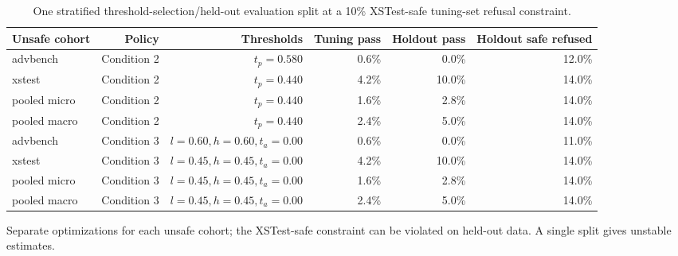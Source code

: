 \begin{table}[t]
\centering
\small
\caption{One stratified threshold-selection/held-out evaluation split at a 10\% XSTest-safe tuning-set refusal constraint.}
\label{tab:jev_holdout}
\begin{tabular}{lrrrrr}
\toprule
Unsafe cohort & Policy & Thresholds & Tuning pass & Holdout pass & Holdout safe refused \\
\midrule
advbench & Condition 2 & $t_p=0.580$ & 0.6\% & 0.0\% & 12.0\% \\
xstest & Condition 2 & $t_p=0.440$ & 4.2\% & 10.0\% & 14.0\% \\
pooled micro & Condition 2 & $t_p=0.440$ & 1.6\% & 2.8\% & 14.0\% \\
pooled macro & Condition 2 & $t_p=0.440$ & 2.4\% & 5.0\% & 14.0\% \\
advbench & Condition 3 & $l=0.60,h=0.60,t_a=0.00$ & 0.6\% & 0.0\% & 11.0\% \\
xstest & Condition 3 & $l=0.45,h=0.45,t_a=0.00$ & 4.2\% & 10.0\% & 14.0\% \\
pooled micro & Condition 3 & $l=0.45,h=0.45,t_a=0.00$ & 1.6\% & 2.8\% & 14.0\% \\
pooled macro & Condition 3 & $l=0.45,h=0.45,t_a=0.00$ & 2.4\% & 5.0\% & 14.0\% \\
\bottomrule
\end{tabular}
\par\vspace{2pt}
\begin{minipage}{\linewidth}
\footnotesize Separate optimizations for each unsafe cohort; the XSTest-safe constraint can be violated on held-out data. A single split gives unstable estimates.
\end{minipage}
\end{table}
